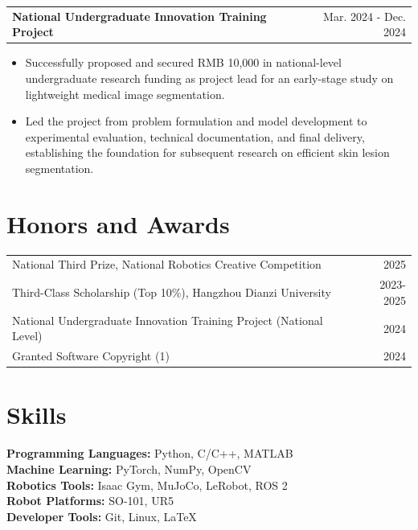 \documentclass[10pt]{article}
\begin{document}
\begin{tabularx}{\textwidth}{@{}Xr@{}}
\textbf{National Undergraduate Innovation Training Project} & Mar. 2024 - Dec. 2024
\end{tabularx}
\begin{itemize}
\item Successfully proposed and secured RMB 10,000 in national-level undergraduate research funding as project lead for an early-stage study on lightweight medical image segmentation.
\item Led the project from problem formulation and model development to experimental evaluation, technical documentation, and final delivery, establishing the foundation for subsequent research on efficient skin lesion segmentation.
\end{itemize}

\section*{Honors and Awards}
\begin{tabularx}{\textwidth}{@{}Xr@{}}
National Third Prize, National Robotics Creative Competition & 2025\\
Third-Class Scholarship (Top 10\%), Hangzhou Dianzi University & 2023-2025\\
National Undergraduate Innovation Training Project (National Level) & 2024\\
Granted Software Copyright (1) & 2024
\end{tabularx}

\section*{Skills}
\textbf{Programming Languages:} Python, C/C++, MATLAB\\
\textbf{Machine Learning:} PyTorch, NumPy, OpenCV\\
\textbf{Robotics Tools:} Isaac Gym, MuJoCo, LeRobot, ROS 2\\
\textbf{Robot Platforms:} SO-101, UR5\\
\textbf{Developer Tools:} Git, Linux, LaTeX
\end{document}

